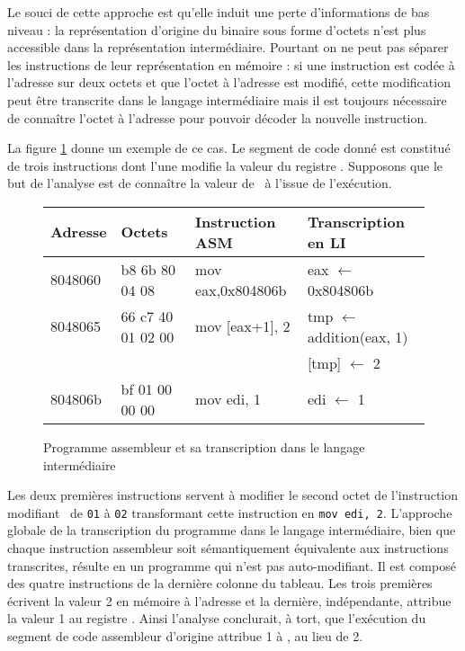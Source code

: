 Le souci de cette approche est qu'elle induit une perte d'informations de bas niveau : la représentation d'origine du binaire sous forme d'octets n'est plus accessible dans la représentation intermédiaire.
Pourtant on ne peut pas séparer les instructions de leur représentation en mémoire : si une instruction est codée à l'adresse  sur deux octets et que l'octet à l'adresse  est modifié, cette modification peut être transcrite dans le langage intermédiaire mais il est toujours nécessaire de connaître l'octet à l'adresse  pour pouvoir décoder la nouvelle instruction.

La figure \ref{fig:prg_asm_li} donne un exemple de ce cas. Le segment de code donné est constitué de trois instructions dont l'une modifie la valeur du registre \edi. Supposons que le but de l'analyse est de connaître la valeur de \edi\ à l'issue de l'exécution.

\begin{figure}[h]
\begin{center}
\begin{tabular}[b]{|l|l|l|l|}
\hline
Adresse & Octets & Instruction ASM & Transcription en LI\\ 
\hline
 8048060  &  b8 6b 80 04 08         &  mov    eax,0x804806b & eax $\leftarrow$ 0x804806b\\
 8048065  &  66 c7 40 01 02 00      &  mov    [eax+1], 2 & tmp $\leftarrow$ addition(eax, 1)\\
          &                         &                                & [tmp] $\leftarrow$ 2 \\
 804806b  &  bf 01 00 00 00         &  mov    edi, 1 & edi $\leftarrow$ 1 \\
\hline
\end{tabular}
\end{center}
\caption{Programme assembleur et sa transcription dans le langage intermédiaire}
\label{fig:prg_asm_li}
\end{figure}

Les deux premières instructions servent à modifier le second octet de l'instruction modifiant \edi\ de \texttt{01} à \texttt{02} transformant cette instruction en \texttt{mov edi, 2}.
L'approche globale de la transcription du programme dans le langage intermédiaire, bien que chaque instruction assembleur soit sémantiquement équivalente aux instructions transcrites, résulte en un programme qui n'est pas auto-modifiant. Il est composé des quatre instructions de la dernière colonne du tableau.
Les trois premières écrivent la valeur 2 en mémoire à l'adresse  et la dernière, indépendante, attribue la valeur 1 au registre \edi.
Ainsi l'analyse conclurait, à tort, que l'exécution du segment de code assembleur d'origine attribue 1 à \edi, au lieu de 2.

